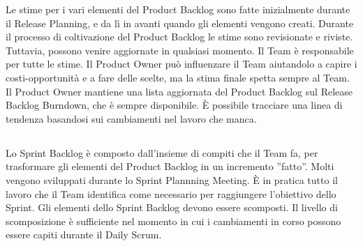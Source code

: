 Le stime per i vari elementi del Product Backlog sono fatte inizialmente durante il Release Planning, e da l\`i in avanti quando gli elementi vengono creati. Durante il processo di coltivazione del Product Backlog le stime sono revisionate e riviste. Tuttavia, possono venire aggiornate in qualsiasi momento. Il Team \`e responsabile per tutte le stime. Il Product Owner pu\`o influenzare il Team aiutandolo a capire i costi-opportunit\`a e a fare delle scelte, ma la stima finale spetta sempre al Team. Il Product Owner mantiene una lista aggiornata del Product Backlog sul Release Backlog Burndown, che \`e sempre disponibile. \`E possibile tracciare una linea di tendenza basandosi sui cambiamenti nel lavoro che manca.  
\newline


  
\subsection*{\color{Blue}{SPRINT BACKLOG E SPRINT BURNDOWN}}
\label{sec:sprintbacklog}

Lo Sprint Backlog \`e composto dall'insieme di compiti che il Team fa, per trasformare gli elementi del Product Backlog in un incremento ''fatto''. Molti vengono sviluppati durante lo Sprint Plannning Meeting. \`E in pratica tutto il lavoro che il Team identifica come necessario per raggiungere l'obiettivo dello Sprint. Gli elementi dello Sprint Backlog devono essere scomposti. Il livello di scomposizione \`e sufficiente nel momento in cui i cambiamenti in corso possono essere capiti durante il Daily Scrum.
\newline

